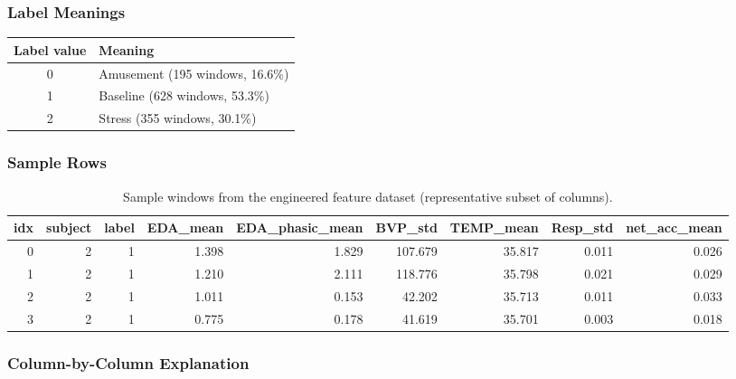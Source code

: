 \documentclass[11pt]{article}
\begin{document}
\subsubsection{Label Meanings}
\begin{center}
\begin{tabular}{cl}
\toprule
\textbf{Label value} & \textbf{Meaning} \\
\midrule
0 & Amusement (195 windows, 16.6\%) \\
1 & Baseline (628 windows, 53.3\%) \\
2 & Stress (355 windows, 30.1\%) \\
\bottomrule
\end{tabular}
\end{center}

\subsubsection{Sample Rows}

\begin{table}[H]
  \centering
  \small
  \begin{tabular}{@{}rrrrrrrrr@{}}
    \toprule
    idx & subject & label & EDA\_mean & EDA\_phasic\_mean & BVP\_std & TEMP\_mean & Resp\_std & net\_acc\_mean \\
    \midrule
    0 & 2 & 1 & 1.398 & 1.829 & 107.679 & 35.817 & 0.011 & 0.026 \\
    1 & 2 & 1 & 1.210 & 2.111 & 118.776 & 35.798 & 0.021 & 0.029 \\
    2 & 2 & 1 & 1.011 & 0.153 & 42.202 & 35.713 & 0.011 & 0.033 \\
    3 & 2 & 1 & 0.775 & 0.178 & 41.619 & 35.701 & 0.003 & 0.018 \\
    \bottomrule
  \end{tabular}
  \caption{Sample windows from the engineered feature dataset (representative subset of columns).}
  \label{tab:samples}
\end{table}

\subsubsection{Column-by-Column Explanation}
\end{document}
